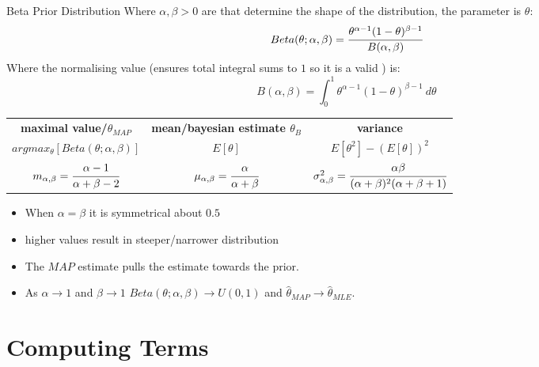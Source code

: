 \begin{definitionbox}{Beta Prior Distribution}
	Where $\alpha, \beta > 0$ are  that determine the shape of the distribution, the parameter is $\theta$:
	\[Beta(\theta; \alpha, \beta) = \cfrac{\theta^{\alpha - 1}(1 - \theta)^{\beta - 1}}{B(\alpha, \beta)}\]
	Where the normalising value (ensures total integral sums to $1$ so it is a valid ) is:
	\[B(\alpha, \beta) = \int_{0}^1\theta^{\alpha - 1}(1 - \theta)^{\beta - 1} \ d\theta\]
	\begin{center}
		\begin{tabular}{c | c | c}
			\textbf{maximal value/$\theta_{MAP}$}                        & \textbf{mean/bayesian estimate $\theta_B$}             & \textbf{variance}                                                                         \\
			$argmax_\theta[Beta(\theta; \alpha, \beta)]$                 & $E[\theta]$                                            & $E[\theta^2] - (E[\theta])^2$                                                             \\
			$m_{\alpha, \beta} = \cfrac{\alpha - 1}{\alpha + \beta - 2}$ & $\mu_{\alpha, \beta} = \cfrac{\alpha}{\alpha + \beta}$ & $\sigma^2_{\alpha, \beta} = \cfrac{\alpha \beta}{(\alpha + \beta)^2(\alpha + \beta + 1)}$ \\
		\end{tabular}
	\end{center}
	\begin{itemize}
		\item When $\alpha = \beta$ it is symmetrical about $0.5$
		\item higher values result in steeper/narrower distribution
		\item The $MAP$ estimate pulls the estimate towards the prior.
		\item As $\alpha \to 1$ and $\beta \to 1$ $Beta(\theta; \alpha, \beta) \to U(0,1)$ and $\hat{\theta}_{MAP} \to \hat{\theta}_{MLE}$.
    \end{itemize}
\end{definitionbox}

\section{Computing Terms}
